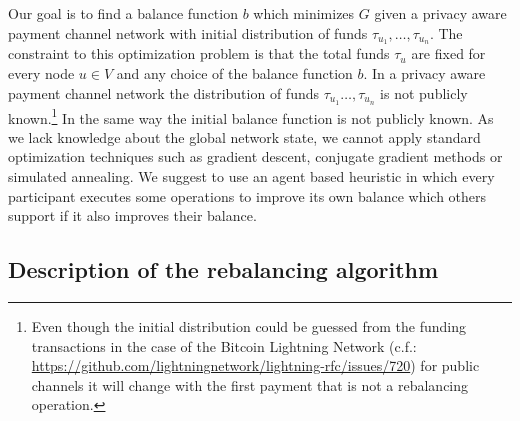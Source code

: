 \documentclass[a4paper]{paper}
\begin{document}
Our goal is to find a balance function $b$ which minimizes $G$ given a privacy aware payment channel network with initial distribution of funds $\tau_{u_1},\dots,\tau_{u_n}$.
The constraint to this optimization problem is that the total funds $\tau_u$ are fixed for every node $u \in V$ and any choice of the balance function $b$.
In a privacy aware payment channel network the distribution of funds $\tau_{u_1}\dots,\tau_{u_n}$ is not publicly known.\footnote{Even though the initial distribution could be guessed from the funding transactions in the case of the Bitcoin Lightning Network (c.f.: \url{https://github.com/lightningnetwork/lightning-rfc/issues/720}) for public channels it will change with the first payment that is not a rebalancing operation.}
In the same way the initial balance function is not publicly known.
As we lack knowledge about the global network state, we cannot apply standard optimization techniques such as gradient descent, conjugate gradient methods or simulated annealing.
We suggest to use an agent based heuristic in which every participant executes some operations to improve its own balance which others support if it also improves their balance.

\subsection{Description of the rebalancing algorithm}
\label{sec:Algorithm}
\end{document}
